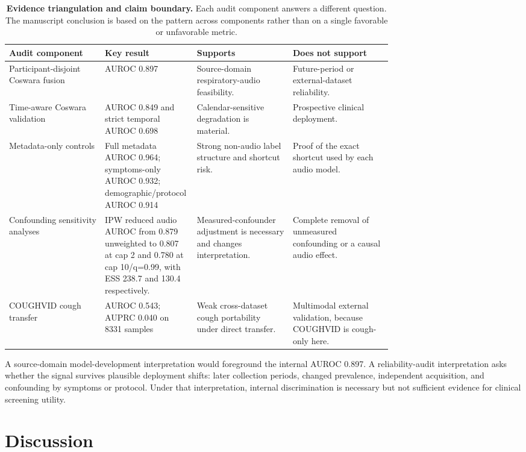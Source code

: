 \documentclass[11pt]{article}
\begin{document}
\begin{table}[t]
\centering
\caption{\textbf{Evidence triangulation and claim boundary.} Each audit component answers a different question. The manuscript conclusion is based on the pattern across components rather than on a single favorable or unfavorable metric.}
\label{tab:evidence_triangulation}
\scriptsize
\setlength{\tabcolsep}{2.5pt}
\begin{tabularx}{\linewidth}{L{0.25\linewidth} L{0.24\linewidth} L{0.25\linewidth} Y}
\toprule
Audit component & Key result & Supports & Does not support \\
\midrule
Participant-disjoint Coswara fusion & AUROC 0.897 & Source-domain respiratory-audio feasibility. & Future-period or external-dataset reliability. \\
Time-aware Coswara validation & AUROC 0.849 and strict temporal AUROC 0.698 & Calendar-sensitive degradation is material. & Prospective clinical deployment. \\
Metadata-only controls & Full metadata AUROC 0.964; symptoms-only AUROC 0.932; demographic/protocol AUROC 0.914 & Strong non-audio label structure and shortcut risk. & Proof of the exact shortcut used by each audio model. \\
Confounding sensitivity analyses & IPW reduced audio AUROC from 0.879 unweighted to 0.807 at cap 2 and 0.780 at cap 10/q=0.99, with ESS 238.7 and 130.4 respectively. & Measured-confounder adjustment is necessary and changes interpretation. & Complete removal of unmeasured confounding or a causal audio effect. \\
COUGHVID cough transfer & AUROC 0.543; AUPRC 0.040 on 8331 samples & Weak cross-dataset cough portability under direct transfer. & Multimodal external validation, because COUGHVID is cough-only here. \\
\bottomrule
\end{tabularx}
\end{table}

A source-domain model-development interpretation would foreground the internal AUROC 0.897. A reliability-audit interpretation asks whether the signal survives plausible deployment shifts: later collection periods, changed prevalence, independent acquisition, and confounding by symptoms or protocol. Under that interpretation, internal discrimination is necessary but not sufficient evidence for clinical screening utility.

\section*{Discussion}
\end{document}
